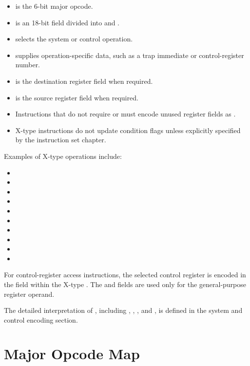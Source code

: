 \begin{itemize}
  \item {} is the 6-bit major opcode.
  \item {} is an 18-bit field divided into  and
        .
  \item {} selects the system or control operation.
  \item {} supplies operation-specific data, such as a trap
        immediate or control-register number.  
  \item {} is the destination register field when required.
  \item {} is the source register field when required.
  \item Instructions that do not require  or  must encode
        unused register fields as .
  \item X-type instructions do not update condition flags unless explicitly
        specified by the instruction set chapter.
\end{itemize}

\noindent
Examples of X-type operations include:

\begin{itemize}
  \item {}
  \item {}
  \item {}
  \item {}
  \item {}
  \item {}
  \item {}
  \item {}
  \item {}
  \item {}
\end{itemize}

\noindent
For control-register access instructions, the selected control register is
encoded in the  field within the X-type . The
 and  fields are used only for the general-purpose
register operand.

The detailed interpretation of , including ,
, , and , is defined in the system
and control encoding section.

\section{Major Opcode Map}

